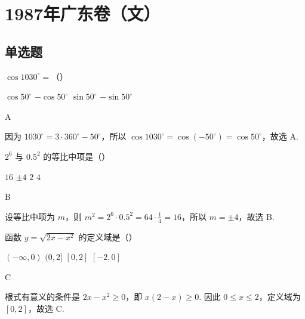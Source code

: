 \documentclass[UTF8,a4paper,oneside,11pt]{ctexbook}
\begin{document}
\mainmatter

\chapter{1987年广东卷（文）}

\section{单选题}

\begin{problem}
\(\cos1030^{\circ}=\)（\quad）

\choices
{\(\cos50^{\circ}\)}
{\(-\cos50^{\circ}\)}
{\(\sin50^{\circ}\)}
{\(-\sin50^{\circ}\)}
\end{problem}

\begin{answer}A\end{answer}

\begin{solution}
因为 \(1030^{\circ}=3\cdot360^{\circ}-50^{\circ}\)，所以 \(\cos1030^{\circ}=\cos(-50^{\circ})=\cos50^{\circ}\)，故选 A.
\end{solution}

\begin{problem}
\(2^{6}\) 与 \(0.5^{2}\) 的等比中项是（\quad）

\choices
{\(16\)}
{\(\pm4\)}
{\(2\)}
{\(4\)}
\end{problem}

\begin{answer}B\end{answer}

\begin{solution}
设等比中项为 \(m\)，则 \(m^{2}=2^{6}\cdot0.5^{2}=64\cdot\frac14=16\)，所以 \(m=\pm4\)，故选 B.
\end{solution}

\begin{problem}
函数 \(y=\sqrt{2x-x^{2}}\) 的定义域是（\quad）

\choices
{\((-\infty,0)\)}
{\((0,2]\)}
{\([0,2]\)}
{\([-2,0]\)}
\end{problem}

\begin{answer}C\end{answer}

\begin{solution}
根式有意义的条件是 \(2x-x^{2}\geqslant0\)，即 \(x(2-x)\geqslant0\). 因此 \(0\leqslant x\leqslant2\)，定义域为 \([0,2]\)，故选 C.
\end{solution}
\end{document}
